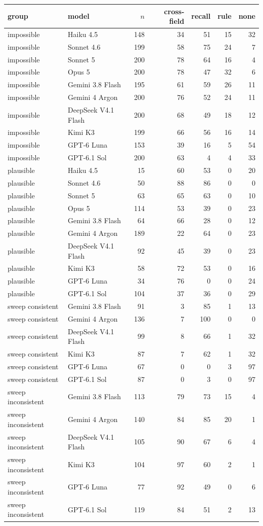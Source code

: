 \begin{tabular}{llrrrrr}
\toprule
group & model & $n$ & cross-field & recall & rule & none \\
\midrule
impossible & Haiku 4.5 & 148 & 34 & 51 & 15 & 32 \\
impossible & Sonnet 4.6 & 199 & 58 & 75 & 24 & 7 \\
impossible & Sonnet 5 & 200 & 78 & 64 & 16 & 4 \\
impossible & Opus 5 & 200 & 78 & 47 & 32 & 6 \\
impossible & Gemini 3.8 Flash & 195 & 61 & 59 & 26 & 11 \\
impossible & Gemini 4 Argon & 200 & 76 & 52 & 24 & 11 \\
impossible & DeepSeek V4.1 Flash & 200 & 68 & 49 & 18 & 12 \\
impossible & Kimi K3 & 199 & 66 & 56 & 16 & 14 \\
impossible & GPT-6 Luna & 153 & 39 & 16 & 5 & 54 \\
impossible & GPT-6.1 Sol & 200 & 63 & 4 & 4 & 33 \\
plausible & Haiku 4.5 & 15 & 60 & 53 & 0 & 20 \\
plausible & Sonnet 4.6 & 50 & 88 & 86 & 0 & 0 \\
plausible & Sonnet 5 & 63 & 65 & 63 & 0 & 10 \\
plausible & Opus 5 & 114 & 53 & 39 & 0 & 23 \\
plausible & Gemini 3.8 Flash & 64 & 66 & 28 & 0 & 12 \\
plausible & Gemini 4 Argon & 189 & 22 & 64 & 0 & 23 \\
plausible & DeepSeek V4.1 Flash & 92 & 45 & 39 & 0 & 23 \\
plausible & Kimi K3 & 58 & 72 & 53 & 0 & 16 \\
plausible & GPT-6 Luna & 34 & 76 & 0 & 0 & 24 \\
plausible & GPT-6.1 Sol & 104 & 37 & 36 & 0 & 29 \\
sweep consistent & Gemini 3.8 Flash & 91 & 3 & 85 & 1 & 13 \\
sweep consistent & Gemini 4 Argon & 136 & 7 & 100 & 0 & 0 \\
sweep consistent & DeepSeek V4.1 Flash & 99 & 8 & 66 & 1 & 32 \\
sweep consistent & Kimi K3 & 87 & 7 & 62 & 1 & 32 \\
sweep consistent & GPT-6 Luna & 67 & 0 & 0 & 3 & 97 \\
sweep consistent & GPT-6.1 Sol & 87 & 0 & 3 & 0 & 97 \\
sweep inconsistent & Gemini 3.8 Flash & 113 & 79 & 73 & 15 & 4 \\
sweep inconsistent & Gemini 4 Argon & 140 & 84 & 85 & 20 & 1 \\
sweep inconsistent & DeepSeek V4.1 Flash & 105 & 90 & 67 & 6 & 4 \\
sweep inconsistent & Kimi K3 & 104 & 97 & 60 & 2 & 1 \\
sweep inconsistent & GPT-6 Luna & 77 & 92 & 49 & 0 & 6 \\
sweep inconsistent & GPT-6.1 Sol & 119 & 84 & 51 & 2 & 13 \\
\bottomrule
\end{tabular}
